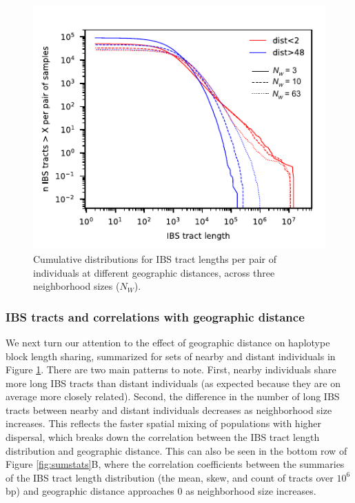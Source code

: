 \documentclass[10pt,twoside,lineno,hidelinks]{preprint}
\begin{document}
\begin{figure}[p]
\centering
\includegraphics[width=.5\textwidth]{figures/ibs_dists2.pdf}
\caption{Cumulative distributions for IBS tract lengths per pair of individuals at different geographic distances, across three neighborhood sizes ($N_{W}$).}
\label{fig:ibs}
\end{figure}


\subsubsection{IBS tracts and correlations with geographic distance}

We next turn our attention to the effect of geographic distance on haplotype block length sharing, summarized for sets of nearby and distant individuals in Figure \ref{fig:ibs}. There are two main patterns to note. First, nearby individuals share more long IBS tracts than distant individuals (as expected because they are on average more closely related). Second, the difference in the number of long IBS tracts between nearby and distant individuals decreases as neighborhood size increases. This reflects the faster spatial mixing of populations with higher dispersal, which breaks down the correlation between the IBS tract length distribution and geographic distance. This can also be seen in the bottom row of Figure \ref{fig:sumstats}B, where the correlation coefficients between the summaries of the IBS tract length distribution (the mean, skew, and count of tracts over $10^6$bp) and geographic distance approaches 0 as neighborhood size increases. 

\end{document}
